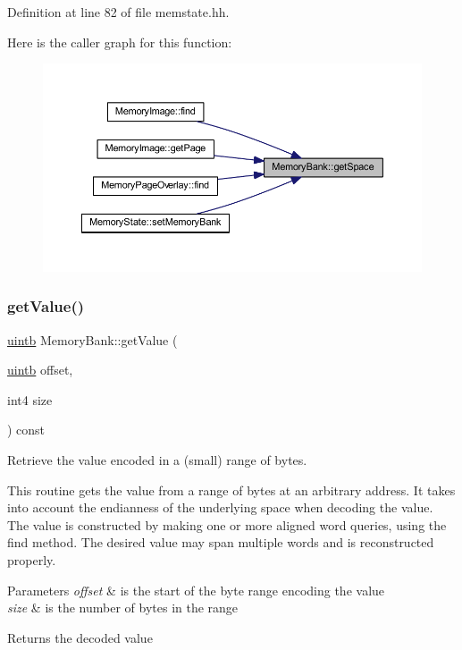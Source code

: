 Definition at line 82 of file memstate.\+hh.

Here is the caller graph for this function\+:
\nopagebreak
\begin{figure}[H]
\begin{center}
\leavevmode
\includegraphics[width=350pt]{class_memory_bank_a8e8f3ea79a07142e2d655eccf4ebc0f0_icgraph}
\end{center}
\end{figure}
\mbox{\label{class_memory_bank_a8149ad04fb877f78b56abd1b67962b31}} 
\subsubsection{\texorpdfstring{getValue()}{getValue()}}
{\footnotesize\ttfamily \mbox{\hyperlink{types_8h_a2db313c5d32a12b01d26ac9b3bca178f}{uintb}} Memory\+Bank\+::get\+Value (\begin{DoxyParamCaption}\item[{\mbox{\hyperlink{types_8h_a2db313c5d32a12b01d26ac9b3bca178f}{uintb}}}]{offset,  }\item[{int4}]{size }\end{DoxyParamCaption}) const}



Retrieve the value encoded in a (small) range of bytes. 

This routine gets the value from a range of bytes at an arbitrary address. It takes into account the endianness of the underlying space when decoding the value. The value is constructed by making one or more aligned word queries, using the find method. The desired value may span multiple words and is reconstructed properly. 
\begin{DoxyParams}{Parameters}
{\em offset} & is the start of the byte range encoding the value \\
\hline
{\em size} & is the number of bytes in the range \\
\hline
\end{DoxyParams}
\begin{DoxyReturn}{Returns}
the decoded value 
\end{DoxyReturn}


